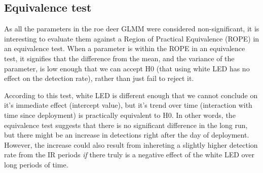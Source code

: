 \subsection{Equivalence test}

As all the parameters in the roe deer GLMM were considered non-significant, it is interesting to evaluate them against a Region of Practical Equivalence (ROPE) in an equivalence test.
When a parameter is within the ROPE in an equivalence test, it signifies that the difference from the mean, and the variance of the parameter, is low enough that we can accept H0 (that using white LED has no effect on the detection rate), rather than just fail to reject it.

According to this test, white LED is different enough that we cannot conclude on it’s immediate effect (intercept value), but it’s trend over time (interaction with time since deployment) is practically equivalent to H0. 
In other words, the equivalence test suggests that there is no significant difference in the long run, but there might be an increase in detections right after the day of deployment.
However, the increase could also result from inhereting a slightly higher detection rate from the IR periods \emph{if} there truly is a negative effect of the white LED over long periods of time.




